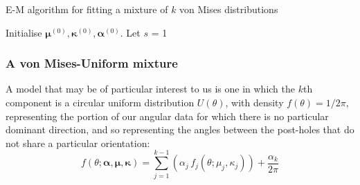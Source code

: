 \documentclass[../../ArchStats.tex]{subfiles}
\begin{document}
\begin{algorithm}[h!]
    \caption{E-M algorithm for fitting a mixture of $k$ von Mises distributions}
	\label{alg:EM-algorithm}



Initialise $\boldsymbol{\mu}^{(0)}, \boldsymbol{\kappa}^{(0)}, \boldsymbol{\alpha}^{(0)}$. Let $s$ = 1\;

\end{algorithm}

\subsubsection{A von Mises-Uniform mixture}
A model that may be of particular interest to us is one in which the $k$th component is a circular uniform distribution $U(\theta)$, with density $f(\theta) = 1/2\pi$, representing the portion of our angular data for which there is no particular dominant direction, and so representing the angles between the post-holes that do not share a particular orientation:
\begin{equation}
f(\theta; \boldsymbol{\alpha, \mu, \kappa}) = \sum_{j=1}^{k-1} \left(\alpha_j \, f_j(\theta; \mu_j, \kappa_j)\right) + \frac{\alpha_k}{2\pi}
\end{equation}
\end{document}
